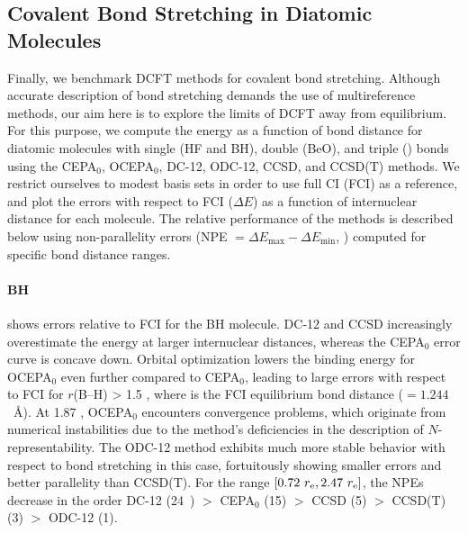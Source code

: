 \subsection{Covalent Bond Stretching in Diatomic Molecules}

Finally, we benchmark DCFT methods for covalent bond stretching.
Although accurate description of bond stretching demands the use of
multireference methods, our aim here is to explore the limits of DCFT away from
equilibrium.
For this purpose, we compute the energy as a function of bond distance for
diatomic molecules with single (HF and BH), double (BeO), and triple ()
bonds using the CEPA$_0$, OCEPA$_0$, DC-12, ODC-12, CCSD, and CCSD(T) methods.
We restrict ourselves to modest basis sets in order to use full CI (FCI) as a
reference, and plot the errors with respect to FCI ($\Delta E$) as a function of
internuclear distance for each molecule.
The relative performance of the methods is described below using non-parallelity
errors (NPE $=\Delta E_\mathrm{max}-\Delta E_\mathrm{min}$, \mhartree) computed
for specific bond distance ranges.


\paragraph{BH}

 shows errors relative to FCI for the BH molecule.
DC-12 and CCSD increasingly overestimate the energy at larger internuclear
distances, whereas the CEPA$_0$ error curve is concave down.
Orbital optimization lowers the binding energy for OCEPA$_0$ even further
compared to CEPA$_0$, leading to large errors with respect to FCI for $r$(B--H)
> 1.5 \re, where \re is the FCI equilibrium bond distance (\re$=1.244$~\AA). At
1.87 \re, OCEPA$_0$ encounters convergence problems, which originate from
numerical instabilities due to the method's deficiencies in the description of
$N$-representability.
The ODC-12 method exhibits much more stable behavior with respect to bond
stretching in this case, fortuitously showing smaller errors and better
parallelity than CCSD(T).
For the range $[0.72\ r_\mathrm{e}, 2.47\ r_\mathrm{e}]$, the NPEs decrease in the order 
DC-12    (24~\mhartree) $>$
CEPA$_0$ (15) $>$
CCSD     (5) $>$
CCSD(T)  (3) $>$
ODC-12   (1).


